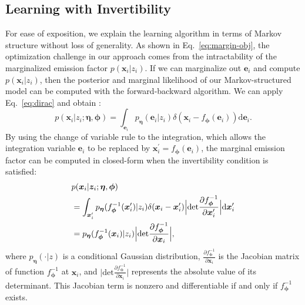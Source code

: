 \documentclass[11pt,a4paper]{article}
\begin{document}
\subsection{Learning with Invertibility}
\label{sec:learn-with-inv}
For ease of exposition, we explain the learning algorithm in terms of Markov structure without loss of generality. As shown in Eq.~\eqref{eq:margin-obj}, the optimization challenge in our approach comes from the intractability of the marginalized emission factor $p(\bm{x}_i|z_i)$. If we can marginalize out $\bm{e}_i$ and compute $p(\bm{x}_i|z_i)$, 
then the posterior and marginal likelihood of our Markov-structured model can be computed with the forward-backward algorithm.  We can apply Eq.~\eqref{eq:dirac} and obtain : 
\begin{equation*}
p(\bm{x}_i | z_i; \bm{\eta}, \bm{\phi}) = \int_{\bm{e}_i}p_{\bm{\eta}}(\bm{e}_i|z_i)\delta(\bm{x}_i-f_{\bm{\phi}}(\bm{e}_i))\text{d}\bm{e}_i.
\end{equation*}
By using the change of variable rule to the integration, which allows the integration variable $\bm{e}_i$ to be replaced by $\bm{x}_i^{\prime}=f_{\bm{\phi}}(\bm{e}_i)$, the marginal emission factor can be computed in closed-form when the invertibility condition is satisfied:
\begin{equation}
\label{eq:emission}
\begin{split}
&p(\bm{x}_i | \bm{z}_i; \bm{\eta}, \bm{\phi}) \\
&= \int_{\bm{x}_i^{\prime}}p_{\bm{\eta}}(f^{-1}_{\bm{\phi}}(\bm{x}_i^{\prime})|z_i)\delta(\bm{x}_i-\bm{x}_i^{\prime})\Big|\text{det} \frac{\partial f^{-1}_{\bm{\phi}}}{\partial \bm{x}_i^{\prime}}\Big|\text{d}\bm{x}_i^{\prime}\\
&= p_{\bm{\eta}}(f^{-1}_{\bm{\phi}}(\bm{x}_i)|z_i)\Big|\text{det}\frac{\partial f^{-1}_{\bm{\phi}}}{\partial \bm{x}_i}\Big|,
\end{split}
\raisetag{1.2\baselineskip}
\end{equation}
where $p_{\bm{\eta}}(\cdot | z)$ is a conditional Gaussian distribution, $\frac{\partial f^{-1}_{\bm{\phi}}}{\partial \bm{x}_i}$ is the Jacobian matrix of function $f_{\bm{\phi}}^{-1}$ at $\bm{x}_i$, and $\big|\text{det}\frac{\partial f^{-1}_{\bm{\phi}}}{\partial \bm{x}_i}\big|$ represents the absolute value of its determinant. This Jacobian term is nonzero and differentiable if and only if $f_{\bm{\phi}}^{-1}$ exists.
\end{document}
